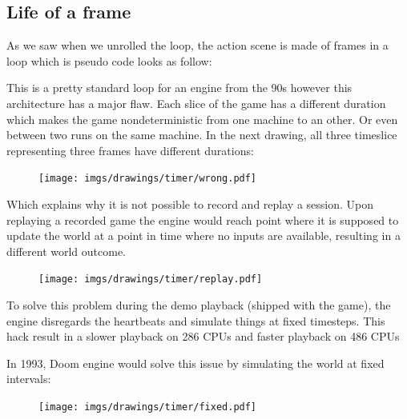 \subsection{Life of a frame}
As we saw when we unrolled the loop, the action scene is made of frames in a loop which is pseudo code looks as follow:\\
\par
\begin{minipage}{\textwidth}
 
 \end{minipage}
\par
This is a pretty standard loop for an engine from the 90s however this architecture has a major flaw. Each slice of the game has a different duration which makes the game nondeterministic from one machine to an other. Or even between two runs on the same machine. In the next drawing, all three timeslice representing three frames have different durations:\\
\begin{figure}[H]
\centering
 \texttt{[image: imgs/drawings/timer/wrong.pdf]}
 
 \end{figure}
  Which explains why it is not possible to record and replay a session. Upon replaying a recorded game the engine would reach point where it is supposed to update the world at a point in time where no inputs are available, resulting in a different world outcome.\\
 \begin{figure}[H]
\centering
 \texttt{[image: imgs/drawings/timer/replay.pdf]}
 
 \end{figure}
\par
To solve this problem during the demo playback (shipped with the game), the engine disregards the heartbeats and simulate things at fixed timesteps. This hack result in a slower playback on 286 CPUs and faster playback on 486 CPUs\\
\par
{} In 1993, Doom engine would solve this issue by simulating the world at fixed intervals:\\
\par
\begin{minipage}{\textwidth}
 
 \end{minipage}
\par
 \begin{figure}[H]
\centering
 \texttt{[image: imgs/drawings/timer/fixed.pdf]}
 
 \end{figure}

